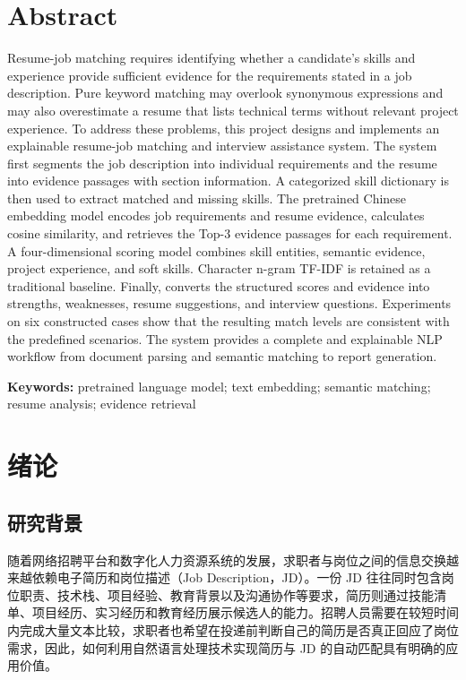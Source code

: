 \documentclass[UTF8,zihao=-4,a4paper,oneside]{ctexrep}
\begin{document}
\chapter*{Abstract}


Resume-job matching requires identifying whether a candidate's skills and experience provide sufficient evidence for the requirements stated in a job description. Pure keyword matching may overlook synonymous expressions and may also overestimate a resume that lists technical terms without relevant project experience. To address these problems, this project designs and implements an explainable resume-job matching and interview assistance system. The system first segments the job description into individual requirements and the resume into evidence passages with section information. A categorized skill dictionary is then used to extract matched and missing skills. The pretrained Chinese embedding model \texttt{} encodes job requirements and resume evidence, calculates cosine similarity, and retrieves the Top-3 evidence passages for each requirement. A four-dimensional scoring model combines skill entities, semantic evidence, project experience, and soft skills. Character n-gram TF-IDF is retained as a traditional baseline. Finally, \texttt{} converts the structured scores and evidence into strengths, weaknesses, resume suggestions, and interview questions. Experiments on six constructed cases show that the resulting match levels are consistent with the predefined scenarios. The system provides a complete and explainable NLP workflow from document parsing and semantic matching to report generation.


\textbf{Keywords:} pretrained language model; text embedding; semantic matching; resume analysis; evidence retrieval


\clearpage
\tableofcontents
\clearpage
{}

\chapter{绪论}


\section{研究背景}


随着网络招聘平台和数字化人力资源系统的发展，求职者与岗位之间的信息交换越来越依赖电子简历和岗位描述（Job Description，JD）。一份 JD 往往同时包含岗位职责、技术栈、项目经验、教育背景以及沟通协作等要求，简历则通过技能清单、项目经历、实习经历和教育经历展示候选人的能力。招聘人员需要在较短时间内完成大量文本比较，求职者也希望在投递前判断自己的简历是否真正回应了岗位需求，因此，如何利用自然语言处理技术实现简历与 JD 的自动匹配具有明确的应用价值。
\end{document}
